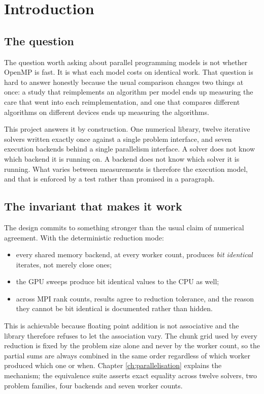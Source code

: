 \chapter{Introduction}

\section{The question}

The question worth asking about parallel programming models is not whether
OpenMP is fast. It is what each model costs on identical work. That question is
hard to answer honestly because the usual comparison changes two things at once:
a study that reimplements an algorithm per model ends up measuring the care that
went into each reimplementation, and one that compares different algorithms on
different devices ends up measuring the algorithms.

This project answers it by construction. One numerical library, twelve iterative
solvers written exactly once against a single problem interface, and seven
execution backends behind a single parallelism interface. A solver does not know
which backend it is running on. A backend does not know which solver it is
running. What varies between measurements is therefore the execution model, and
that is enforced by a test rather than promised in a paragraph.

\section{The invariant that makes it work}

The design commits to something stronger than the usual claim of numerical
agreement. With the deterministic reduction mode:

\begin{itemize}
  \item every shared memory backend, at every worker count, produces
        \emph{bit identical} iterates, not merely close ones;
  \item the GPU sweeps produce bit identical values to the CPU as well;
  \item across MPI rank counts, results agree to reduction tolerance, and the
        reason they cannot be bit identical is documented rather than hidden.
\end{itemize}

This is achievable because floating point addition is not associative and the
library therefore refuses to let the association vary. The chunk grid used by
every reduction is fixed by the problem size alone and never by the worker
count, so the partial sums are always combined in the same order regardless of
which worker produced which one or when. Chapter \ref{ch:parallelisation}
explains the mechanism; the equivalence suite asserts exact equality across
twelve solvers, two problem families, four backends and seven worker counts.

